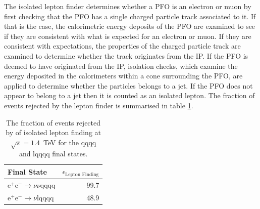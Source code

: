 The isolated lepton finder determines whether a PFO is an electron or muon by first checking that the PFO has a single charged particle track associated to it.  If that is the case, the calorimetric energy deposits of the PFO are examined to see if they are consistent with what is expected for an electron or muon.  If they are consistent with expectations, the properties of the charged particle track are examined to determine whether the track originates from the IP.  If the PFO is deemed to have originated from the IP, isolation checks, which examine the energy deposited in the calorimeters within a cone surrounding the PFO, are applied to determine whether the particles belongs to a jet.  If the PFO does not appear to belong to a jet then it is counted as an isolated lepton.  The fraction of events rejected by the lepton finder is summarised in table \ref{table:efficiencyleptonfinding}.   

\begin{table}[h!]
\centering
\begin{tabular}{ l r }
\hline
Final State & $\epsilon_{\text{Lepton Finding}}$ \\ 
\hline
$\text{e}^{+}\text{e}^{-} \rightarrow \nu{\nu}\text{qqqq}$ & 99.7 \\
$\text{e}^{+}\text{e}^{-} \rightarrow \nu\text{lqqqq}$ & 48.9 \\
\hline
\end{tabular}
\caption[The fraction of events rejected by of isolated lepton finding at $\sqrt{s}=1.4$~TeV for the {\nu}{\nu}qqqq and {\nu}lqqqq final states.]{The fraction of events rejected by of isolated lepton finding at $\sqrt{s}=1.4$~TeV for the {\nu}{\nu}qqqq and {\nu}lqqqq final states.}
\label{table:efficiencyleptonfinding}
\end{table}


